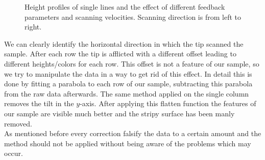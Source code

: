 \documentclass[paper=a4,fontsize=10pt,DIV=18,twocolumn,parskip=half]{scrartcl}
\numberwithin{equation}{section}    %
\begin{document}
\begin{figure}
    \caption{Height profiles of single lines and the effect of different 
    feedback parameters and scanning velocities. Scanning direction is from left 
    to right.}
\end{figure}

We can clearly identify the horizontal direction in which the tip scanned the 
sample. After each row the tip is afflicted with a different offset leading to 
different heights/colors for each row. This offset is not a feature of our 
sample, so we try to manipulate the data in a way to get rid of this effect.
In detail this is done by fitting a parabola to each row of our sample, 
subtracting this parabola from the raw data afterwards. The same method applied 
on the single column removes the tilt in the $y$-axis. After applying this 
flatten function the features of our sample are visible much better and the 
stripy surface has been manly removed. \\
As mentioned before every correction falsify the data to a certain amount and 
the method should not be applied without being aware of the problems which may 
occur.
\end{document}
